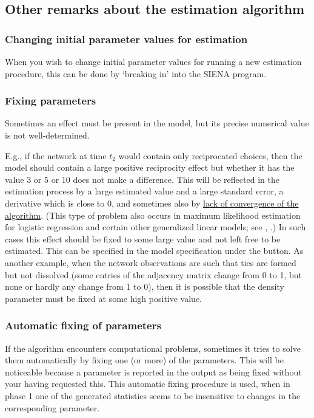 \documentclass[a4paper,fleqn]{article}
\newcommand{\+}{\, + \,}
\newcommand{\SI}{{\sf SIENA }}
\begin{document}
{\subsection{Other remarks about the estimation algorithm}

\subsubsection{Changing initial parameter values for estimation}
\label{S_st}

When you wish to change initial parameter values for running a new
estimation procedure, this can be done by `breaking in' into the \SI program.
\fi

\subsubsection{Fixing parameters}
\label{S_fixingparameters}

\hypertarget{T_fix}{Sometimes an effect must be present in the
model, but its precise numerical value is not well-determined.}
E.g., if the network at time $t_2$ would contain only reciprocated
choices, then the model should contain a large positive
reciprocity effect but whether it has the value 3 or 5 or 10 does
not make a difference. This will be reflected in the estimation
process by a large estimated value and a large standard error, a
derivative which is close to 0, and sometimes also by
\hyperlink{T_convergence}{lack of convergence of the algorithm}.
(This type of problem also occurs in maximum likelihood estimation
for logistic regression and certain other generalized linear
models; \label{LargeFix} see \citet[section 1.6]{GeyerThompson92},
\citet{AlbertAnderson84, HauckDonner77}.)
In such cases this effect
should be fixed to some large value and not left free to be
estimated. This can be specified in the model specification
under the {} %
button. As another example, when the network
observations are such that ties are formed but not dissolved (some
entries of the adjacency matrix change from 0 to 1, but none or
hardly any change from 1 to 0), then it is possible that the
density parameter must be fixed at some high positive value.

\subsubsection{Automatic fixing of parameters}
\label{S_fixing}

If the algorithm encounters computational
problems, sometimes it tries to solve them automatically by fixing
one (or more) of the parameters. This will be noticeable because a
parameter is reported in the output as being fixed without your
having requested this. This automatic fixing procedure is used,
when in phase 1 one of the generated statistics seems to be
insensitive to changes in the corresponding parameter.

}
\end{document}
